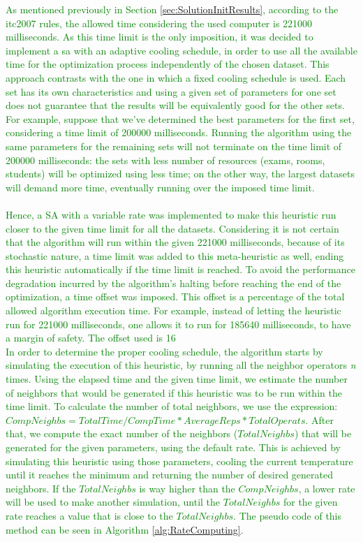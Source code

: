 \textcolor{green}{As mentioned previously in Section \ref{sec:SolutionInitResults}, according to the \gls{itc2007} rules, the allowed time considering the used computer is 221000 milliseconds. As this time limit is the only imposition, it was decided to implement a \gls{sa} with an adaptive cooling schedule, in order to use all the available time for the optimization process independently of the chosen dataset. This approach contrasts with the one in which a fixed cooling schedule is used. Each set has its own characteristics and using a given set of parameters for one set does not guarantee that the results will be equivalently good for the other sets. For example, suppose that we've determined the best parameters for the first set, considering a time limit of 200000 milliseconds. Running the algorithm using the same parameters for the remaining sets will not terminate on the time limit of 200000 milliseconds: the sets with less number of resources (exams, rooms, students) will be optimized using less time; on the other way, the largest datasets will demand more time, eventually running over the imposed time limit.\\
\\
Hence, a SA with a variable rate was implemented to make this heuristic run closer to the given time limit for all the datasets. Considering it is not certain that the algorithm will run within the given 221000 milliseconds, because of its stochastic nature, a time limit was added to this meta-heuristic as well, ending this heuristic automatically if the time limit is reached. To avoid the performance degradation incurred by the algorithm's halting before reaching the end of the optimization, a time offset was imposed. This offset is a percentage of the total allowed algorithm execution time. For example, instead of letting the heuristic run for 221000 milliseconds, one allows it to run for 185640 milliseconds, to have a margin of safety. The offset used is 16%
\\
In order to determine the proper cooling schedule, the algorithm starts by simulating the execution of this heuristic, by running all the neighbor operators \textit{n} times. Using the elapsed time and the given time limit, we estimate the number of neighbors that would be generated if this heuristic was to be run within the time limit. To calculate the number of total neighbors, we use the expression: $CompNeighbs = TotalTime / CompTime * AverageReps * TotalOperats$. After that, we compute the exact number of the neighbors ($TotalNeighbs$) that will be generated for the given parameters, using the default rate. This is achieved by simulating this heuristic using those parameters, cooling the current temperature until it reaches the minimum and returning the number of desired generated neighbors. If the $TotalNeighbs$ is way higher than the $CompNeighbs$, a lower rate will be used to make another simulation, until the $TotalNeighbs$ for the given rate reaches a value that is close to the $TotalNeighbs$. The pseudo code of this method can be seen in Algorithm \ref{alg:RateComputing}.\\
}
